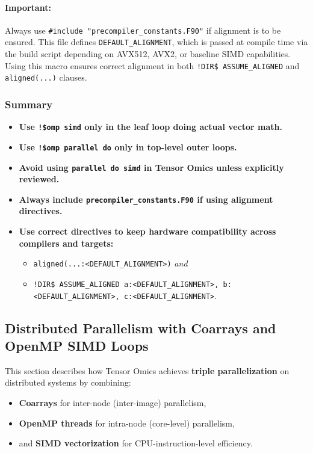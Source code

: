 \documentclass{article}
\begin{document}
\paragraph{Important:} Always use \texttt{\#include "precompiler\_constants.F90"} if alignment is to be ensured. This file defines \texttt{DEFAULT\_ALIGNMENT}, which is passed at compile time via the build script depending on AVX512, AVX2, or baseline SIMD capabilities. Using this macro ensures correct alignment in both \texttt{!DIR\$ ASSUME\_ALIGNED} and \texttt{aligned(...)} clauses.

\subsubsection{Summary}

\begin{itemize}
\item \textbf{Use \texttt{!\$omp simd} only in the leaf loop doing actual vector math.}
\item \textbf{Use \texttt{!\$omp parallel do} only in top-level outer loops.}
\item \textbf{Avoid using \texttt{parallel do simd} in Tensor Omics unless explicitly reviewed.}
\item \textbf{Always include \texttt{precompiler\_constants.F90} if using alignment directives.}
\item \textbf{Use correct directives to keep hardware compatibility across
  compilers and targets:}
  \begin{itemize}
    \item \texttt{aligned(...:<DEFAULT\_ALIGNMENT>)} \emph{and}
    \item \texttt{!DIR\$ ASSUME\_ALIGNED a:<DEFAULT\_ALIGNMENT>,
      b:<DEFAULT\_ALIGNMENT>, c:<DEFAULT\_ALIGNMENT>}.
  \end{itemize}
\end{itemize}

\subsection{Distributed Parallelism with Coarrays and OpenMP SIMD Loops}

This section describes how Tensor Omics achieves \textbf{triple parallelization} on distributed systems by combining:

\begin{itemize}
  \item \textbf{Coarrays} for inter-node (inter-image) parallelism,
  \item \textbf{OpenMP threads} for intra-node (core-level) parallelism,
  \item and \textbf{SIMD vectorization} for CPU-instruction-level efficiency.
\end{itemize}
\end{document}
